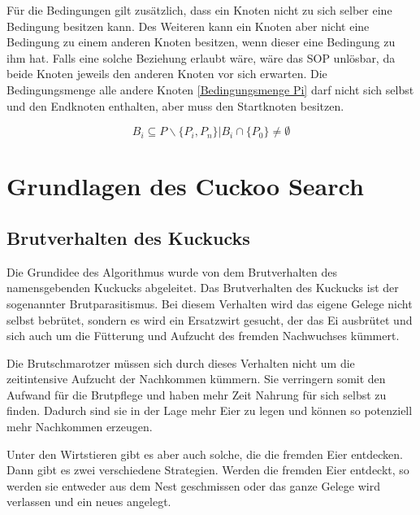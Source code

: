 \documentclass[conference]{IEEEtran}
\begin{document}
      Für die Bedingungen gilt zusätzlich, dass ein Knoten nicht zu sich selber eine Bedingung besitzen kann.
      Des Weiteren kann ein Knoten aber nicht eine Bedingung zu einem anderen Knoten besitzen, wenn dieser eine Bedingung zu ihm hat. 
      Falls eine solche Beziehung erlaubt wäre, wäre das SOP unlösbar, da beide Knoten jeweils den anderen Knoten vor sich erwarten.
      Die Bedingungsmenge alle andere Knoten \eqref{Bedingungsmenge Pi} darf nicht sich selbst und den Endknoten enthalten, aber muss den Startknoten
      besitzen.

      \begin{equation}\label{Bedingungsmenge Pi}
          B_i \subseteq P\backslash\{P_i, P_n\} | B_i \cap \{P_0\} \neq \emptyset
      \end{equation}


  \section{Grundlagen des Cuckoo Search}
    \subsection{Brutverhalten des Kuckucks}
      Die Grundidee des Algorithmus wurde von dem Brutverhalten des namensgebenden Kuckucks abgeleitet. Das Brutverhalten des Kuckucks 
      ist der sogenannter Brutparasitismus. Bei diesem Verhalten wird das eigene Gelege nicht selbst bebrütet, sondern es wird ein 
      Ersatzwirt gesucht, der das Ei ausbrütet und sich auch um die Fütterung und Aufzucht des fremden Nachwuchses kümmert.

      Die Brutschmarotzer müssen sich durch dieses Verhalten nicht um die zeitintensive Aufzucht der Nachkommen kümmern. 
      Sie verringern somit den Aufwand für die Brutpflege und haben mehr Zeit Nahrung für sich selbst zu finden. Dadurch sind 
      sie in der Lage mehr Eier zu legen und können so potenziell mehr Nachkommen erzeugen. 

      Unter den Wirtstieren gibt es aber auch solche, die die fremden Eier entdecken. Dann gibt es zwei verschiedene Strategien. 
      Werden die fremden Eier entdeckt, so werden sie entweder aus dem Nest geschmissen oder das ganze Gelege wird verlassen und 
      ein neues angelegt. 
\end{document}

